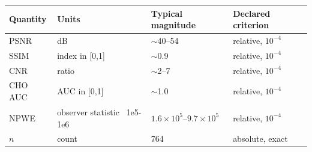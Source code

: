 \begin{tabular}{llll}
\toprule
Quantity & Units & Typical magnitude & Declared criterion \\
\midrule
PSNR & dB & $\sim$40--54 & relative, $10^{-4}$ \\
SSIM & index in [0,1] & $\sim$0.9 & relative, $10^{-4}$ \\
CNR & ratio & $\sim$2--7 & relative, $10^{-4}$ \\
CHO AUC & AUC in [0,1] & $\sim$1.0 & relative, $10^{-4}$ \\
NPWE & observer statistic ~1e5-1e6 & $1.6\times10^{5}$--$9.7\times10^{5}$ & relative, $10^{-4}$ \\
$n$ & count & 764 & absolute, exact \\
\bottomrule
\end{tabular}
